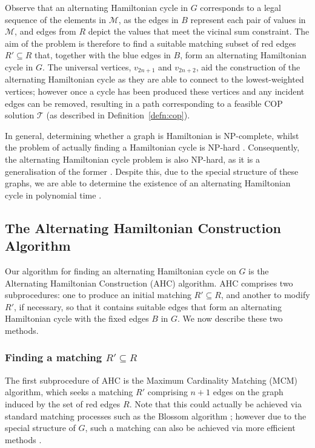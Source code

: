 \documentclass{IEEEtran}
\begin{document}
Observe that an alternating Hamiltonian cycle in $G$ corresponds to a legal sequence of the elements in $\mathcal{M}$, as the edges in $B$ represent each pair of values in $\mathcal{M}$, and edges from $R$ depict the values that meet the vicinal sum constraint. The aim of the problem is therefore to find a suitable matching subset of red edges $R' \subseteq R$ that, together with the blue edges in $B$, form an alternating Hamiltonian cycle in $G$. The universal vertices, $v_{2n+1}$ and $v_{2n+2}$, aid the construction of the alternating Hamiltonian cycle as they are able to connect to the lowest-weighted vertices; however once a cycle has been produced these vertices and any incident edges can be removed, resulting in a path corresponding to a feasible COP solution $\mathcal{T}$ (as described in Definition~\ref{defn:cop}).

In general, determining whether a graph is Hamiltonian is NP-complete, whilst the problem of actually finding a Hamiltonian cycle is NP-hard \cite{karp1972}. Consequently, the alternating Hamiltonian cycle problem is also NP-hard, as it is a generalisation of the former \cite{haggkvist1977}. Despite this, due to the special structure of these graphs, we are able to determine the existence of an alternating Hamiltonian cycle in polynomial time \cite{hawa2018}. 

\subsection{The Alternating Hamiltonian Construction Algorithm}
\label{sub:ahc}
Our algorithm for finding an alternating Hamiltonian cycle on $G$ is the Alternating Hamiltonian Construction (AHC) algorithm. AHC comprises two subprocedures: one to produce an initial matching $R' \subseteq R$, and another to modify $R'$, if necessary, so that it contains suitable edges that form an alternating Hamiltonian cycle with the fixed edges $B$ in $G$. We now describe these two methods.

\subsubsection{Finding a matching $R' \subseteq R$}
\label{subsub:mcm}
The first subprocedure of AHC is the Maximum Cardinality Matching (MCM) algorithm, which seeks a matching $R'$ comprising $n+1$ edges on the graph induced by the set of red edges $R$. Note that this could actually be achieved via standard matching processes such as the Blossom algorithm \cite{edmonds1965}; however due to the special structure of $G$, such a matching can also be achieved via more efficient methods \cite{mahadev1994, becker2015}.
\end{document}
